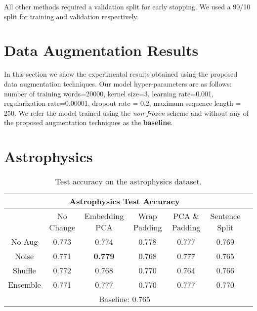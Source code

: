 All other methods required a validation split for early stopping. We used a 90/10 split for training and validation respectively.

\section{Data Augmentation Results}
In this section we show the experimental results obtained using the proposed data augmentation techniques. Our model hyper-parameters are as follows:
number of training words=20000, kernel size=3, learning rate=0.001, regularization rate=0.00001,
dropout rate = 0.2, maximum sequence length = 250. We refer the model trained using the \textit{non-frozen} scheme
and without any of the proposed augmentation techniques as the \textbf{baseline}.

\section{Astrophysics}
\begin{center}
\begin{table}[H]
\begin{tabular}{|c||c|c|c|c|c|c|}
 \hline
 \multicolumn{6}{|c|}{\textbf{Astrophysics Test Accuracy}}\\ \hline
  & No Change & Embedding PCA & Wrap Padding & PCA \& Padding & Sentence Split\\  \hline
  No Aug & 0.773 & 0.774 & 0.778 & 0.777 & 0.769 \\ \hline
  Noise &  0.771 & \textbf{0.779} & 0.768 & 0.777 & 0.765  \\  \hline
  Shuffle & 0.772 & 0.768 & 0.770 & 0.764 & 0.766 \\      \hline
  Ensemble & 0.771 & 0.777 &  0.770 & 0.777 & 0.770 \\      \hline
  \multicolumn{6}{|c|}{Baseline: 0.765}\\ \hline
  \end{tabular}
\caption{Test accuracy on the astrophysics dataset.}
\end{table}
  \end{center}

